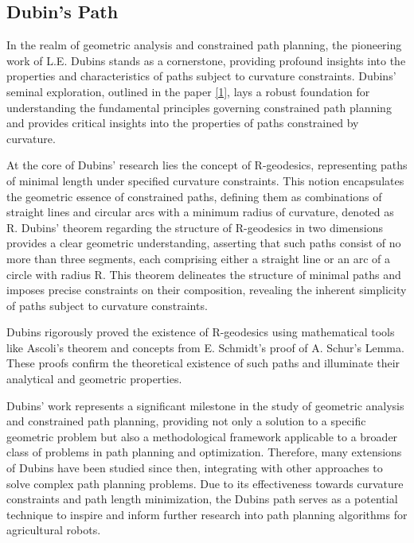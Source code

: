 \subsection{Dubin's Path}

In the realm of geometric analysis and constrained path planning, the pioneering work of L.E. Dubins stands as a cornerstone, providing profound insights into the properties and characteristics of paths subject to curvature constraints. Dubins' seminal exploration, outlined in the paper \hyperlink{cite.dubins}{[1]}, lays a robust foundation for understanding the fundamental principles governing constrained path planning and provides critical insights into the properties of paths constrained by curvature.

\vspace{6mm}

At the core of Dubins' research lies the concept of R-geodesics, representing paths of minimal length under specified curvature constraints. This notion encapsulates the geometric essence of constrained paths, defining them as combinations of straight lines and circular arcs with a minimum radius of curvature, denoted as R. Dubins' theorem regarding the structure of R-geodesics in two dimensions provides a clear geometric understanding, asserting that such paths consist of no more than three segments, each comprising either a straight line or an arc of a circle with radius R. This theorem delineates the structure of minimal paths and imposes precise constraints on their composition, revealing the inherent simplicity of paths subject to curvature constraints.

\vspace*{6mm}

Dubins rigorously proved the existence of R-geodesics using mathematical tools like Ascoli's theorem and concepts from E. Schmidt's proof of A. Schur's Lemma. These proofs confirm the theoretical existence of such paths and illuminate their analytical and geometric properties.

\vspace*{6mm}

Dubins' work represents a significant milestone in the study of geometric analysis and constrained path planning, providing not only a solution to a specific geometric problem but also a methodological framework applicable to a broader class of problems in path planning and optimization. Therefore, many extensions of Dubins have been studied since then, integrating with other approaches to solve complex path planning problems. Due to its effectiveness towards curvature constraints and path length minimization, the Dubins path serves as a potential technique to inspire and inform further research into path planning algorithms for agricultural robots.


